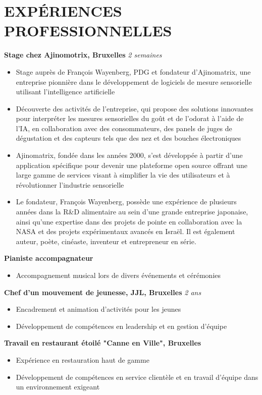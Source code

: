 \documentclass{article}
\begin{document}
\section{EXPÉRIENCES PROFESSIONNELLES}
\textbf{Stage chez Ajinomotrix, Bruxelles}
\textit{2 semaines}
\begin{itemize}
\item Stage auprès de François Wayenberg, PDG et fondateur d'Ajinomatrix, une entreprise pionnière dans le développement de logiciels de mesure sensorielle utilisant l'intelligence artificielle
\item Découverte des activités de l'entreprise, qui propose des solutions innovantes pour interpréter les mesures sensorielles du goût et de l'odorat à l'aide de l'IA, en collaboration avec des consommateurs, des panels de juges de dégustation et des capteurs tels que des nez et des bouches électroniques
\item Ajinomatrix, fondée dans les années 2000, s'est développée à partir d'une application spécifique pour devenir une plateforme open source offrant une large gamme de services visant à simplifier la vie des utilisateurs et à révolutionner l'industrie sensorielle
\item Le fondateur, François Wayenberg, possède une expérience de plusieurs années dans la R\&D alimentaire au sein d'une grande entreprise japonaise, ainsi qu'une expertise dans des projets de pointe en collaboration avec la NASA et des projets expérimentaux avancés en Israël. Il est également auteur, poète, cinéaste, inventeur et entrepreneur en série.
\end{itemize}

\textbf{Pianiste accompagnateur}
\begin{itemize}
\item Accompagnement musical lors de divers événements et cérémonies
\end{itemize}

\textbf{Chef d'un mouvement de jeunesse, JJL, Bruxelles}
\textit{2 ans}
\begin{itemize}
\item Encadrement et animation d'activités pour les jeunes
\item Développement de compétences en leadership et en gestion d'équipe
\end{itemize}

\textbf{Travail en restaurant étoilé "Canne en Ville", Bruxelles}
\begin{itemize}
\item Expérience en restauration haut de gamme
\item Développement de compétences en service clientèle et en travail d'équipe dans un environnement exigeant
\end{itemize}
\end{document}
